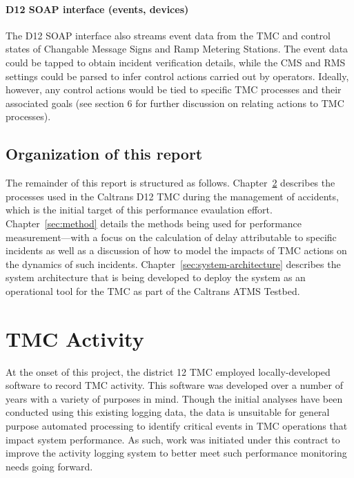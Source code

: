 \documentclass[12pt]{report}
\begin{document}
\subsubsection{D12 SOAP interface (events, devices)}

The D12 SOAP interface also streams event data from the TMC and control states
of Changable Message Signs and Ramp Metering Stations.  The event data could be
tapped to obtain incident verification details, while the CMS and RMS settings
could be parsed to infer control actions carried out by operators.  Ideally,
however, any control actions would be tied to specific TMC processes and their
associated goals (see section 6 for further discussion on relating actions to
TMC processes).

\section{Organization of this report}
\label{sec:organization}


The remainder of this report is structured as follows.
Chapter~\ref{chap:tmc-activity} describes the processes used in the Caltrans D12
TMC during the management of accidents, which is the initial target of this
performance evaulation effort.  Chapter~\ref{sec:method} details the methods
being used for performance measurement---with a focus on the calculation of
delay attributable to specific incidents as well as a discussion of how to model
the impacts of TMC actions on the dynamics of such incidents.
Chapter~\ref{sec:system-architecture} describes the system architecture that is
being developed to deploy the system as an operational tool for the TMC as part
of the Caltrans ATMS Testbed.

\chapter{TMC Activity}
\label{chap:tmc-activity}

At the onset of this project, the district 12 TMC employed locally-developed
software to record TMC activity.  This software was developed over a number of
years with a variety of purposes in mind.  Though the initial analyses have been
conducted using this existing logging data, the data is unsuitable for general
purpose automated processing to identify critical events in TMC operations that
impact system performance.  As such, work was initiated under this contract to
improve the activity logging system to better meet such performance monitoring
needs going forward.
\end{document}
